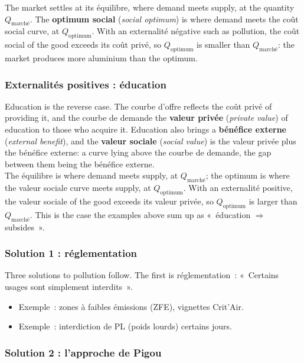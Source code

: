 The market settles at its équilibre, where demand meets supply, at the quantity
$Q_{\text{marché}}$. The \textbf{optimum social} (\textit{social optimum}) is where
demand meets the coût social curve, at $Q_{\text{optimum}}$. With an externalité
négative such as pollution, the coût social of the good exceeds its coût privé, so
$Q_{\text{optimum}}$ is smaller than $Q_{\text{marché}}$: the market produces more
aluminium than the optimum.

\subsubsection{Externalités positives : éducation}

Education is the reverse case. The courbe d'offre reflects the coût privé of
providing it, and the courbe de demande the \textbf{valeur privée}
(\textit{private value}) of education to those who acquire it. Education also
brings a \textbf{bénéfice externe} (\textit{external benefit}), and the
\textbf{valeur sociale} (\textit{social value}) is the valeur privée plus the
bénéfice externe: a curve lying above the courbe de demande, the gap between them
being the bénéfice externe.\\

The équilibre is where demand meets supply, at $Q_{\text{marché}}$; the optimum is
where the valeur sociale curve meets supply, at $Q_{\text{optimum}}$. With an
externalité positive, the valeur sociale of the good exceeds its valeur privée, so
$Q_{\text{optimum}}$ is larger than $Q_{\text{marché}}$. This is the case the
examples above sum up as «~éducation $\Longrightarrow$ subsides~».

\subsubsection{Solution 1 : réglementation}

Three solutions to pollution follow. The first is réglementation~: «~Certains
usages sont simplement interdits~».
\begin{itemize}
  \item Exemple~: zones à faibles émissions (ZFE), vignettes Crit'Air.
  \item Exemple~: interdiction de PL (poids lourds) certains jours.
\end{itemize}

\subsubsection{Solution 2 : l'approche de Pigou}

